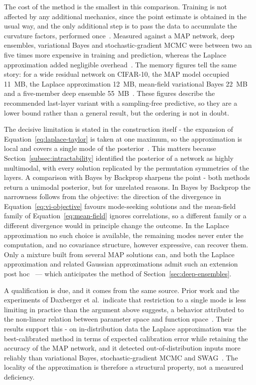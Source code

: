 The cost of the method is the smallest in this comparison. Training is
not affected by any additional mechanics, since the point estimate is obtained in the usual way, and the only additional step is to pass the data to accumulate the curvature factors,
performed once~\cite{ritter2018}. Measured against a MAP network, deep ensembles, variational Bayes and stochastic-gradient MCMC were between two an five times more expensive in training and prediction, whereas the Laplace approximation added negligible overhead~\cite{daxberger2021}. The memory figures tell the same story: for a wide residual network on CIFAR-10, the MAP model occupied 11~MB, the Laplace approximation 12~MB, mean-field variational Bayes 22~MB and a five-member deep ensemble 55~MB~\cite{daxberger2021}. These figures describe the recommended last-layer variant with a sampling-free predictive, so they are a lower bound rather than a general result, but the ordering is not in   doubt.

The decisive limitation is stated in the construction itself - the expansion of
Equation~\eqref{eq:laplace-taylor} is taken at one maximum, so the approximation
is local and covers a single mode of the posterior~\cite{daxberger2021}. This
matters because Section~\ref{subsec:intractability} identified the posterior of a
network as highly multimodal, with every solution replicated by the permutation
symmetries of the layers. A comparison with Bayes by Backprop sharpens the point -
both methods return a unimodal posterior, but for unrelated reasons. In Bayes by
Backprop the narrowness follows from the objective: the direction of the
divergence in Equation~\eqref{eq:vi-objective} favours mode-seeking solutions and
the mean-field family of Equation~\eqref{eq:mean-field} ignores correlations, so
a different family or a different divergence would in principle change the
outcome. In the Laplace approximation no such choice is available, the remaining
modes never enter the computation, and no covariance structure, however
expressive, can recover them. Only a mixture built from several MAP solutions
can, and both the Laplace approximation and related Gaussian approximations
admit such an extension post hoc~\cite{daxberger2021} — which anticipates the
method of Section~\ref{sec:deep-ensembles}.

A qualification is due, and it comes from the same source. Prior work and the
experiments of Daxberger et al.\ indicate that restriction to a single mode is
less limiting in practice than the argument above suggests, a behavior
attributed to the non-linear relation between parameter space and function
space~\cite{daxberger2021}. Their results support this - on in-distribution data
the Laplace approximation was the best-calibrated method in terms of expected
calibration error while retaining the accuracy of the MAP network, and it
detected out-of-distribution inputs more reliably than variational Bayes,
stochastic-gradient MCMC and SWAG~\cite{daxberger2021}. The locality of the
approximation is therefore a structural property, not a measured deficiency.

